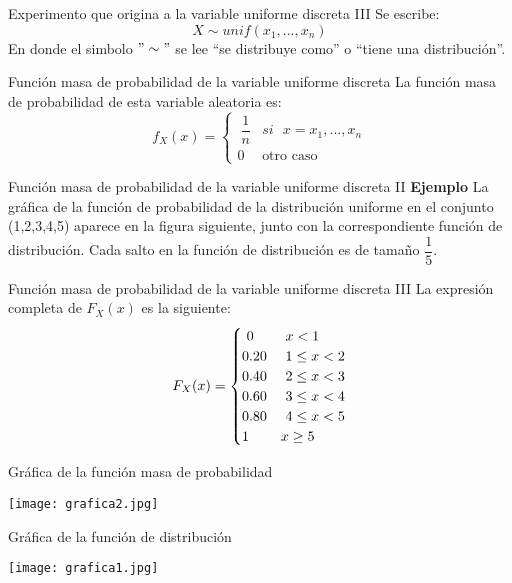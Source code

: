 \documentclass[11pt]{beamer}
\begin{document}
\begin{frame}{Experimento que origina a la variable uniforme discreta III}
Se escribe:
$$X \sim unif(x_{1},...,x_{n})$$
En donde el simbolo $"\sim"$ se lee “se distribuye como” o “tiene una distribución”. 
\end{frame}

\begin{frame}{Función masa de probabilidad de la variable uniforme discreta}
La función masa de probabilidad de esta variable aleatoria es:
$$
f_{X} (x)=\begin{cases}
\ {\dfrac{1}{n}} & si \mbox{ $x=x_{1},...,x_{n}$}\\{0 }& \mbox{otro caso}\
\end{cases}
$$
\end{frame}
\begin{frame}{Función masa de probabilidad de la variable uniforme discreta II}
\textbf{Ejemplo}
La gráfica de la función de probabilidad de la distribución
uniforme en el conjunto (1,2,3,4,5) aparece en la figura siguiente, junto con la correspondiente función de distribución. Cada salto en la función de distribución es de tamaño $\dfrac{1}{5}$. 
\end{frame}
\begin{frame}{Función masa de probabilidad de la variable uniforme discreta III}
La expresión completa de $F_{X}(x)$ es la siguiente:
$$
F_{X} (x)=\begin{cases}
\ {0} &  \mbox{ $x<1$}\\ {0.20} &  \mbox{ $1\leq x<2$}\\ {0.40} &  \mbox{ $2\leq x<3$}\\ {0.60} &  \mbox{ $3\leq x<4$}\\ {0.80} &  \mbox{ $4\leq x<5$}\\ {1} &  \mbox{$ x\geq 5$}\
\end{cases}
$$
\end{frame}

\begin{frame}{Gráfica de la función masa de probabilidad}
\begin{center}
\texttt{[image: grafica2.jpg]}
\end{center}
\end{frame}

\begin{frame}{Gráfica de la función de distribución}
\begin{center}
\texttt{[image: grafica1.jpg]}
\end{center}
\end{frame}
\end{document}

